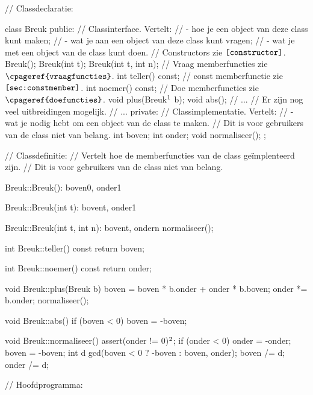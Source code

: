 \begin{cpplstShortInline}
\begin{cpplstfragment}[mathescape=true]
// Classdeclaratie:

$\label{breuk1::classdeclaratie}$class Breuk {
public:
    // Classinterface. Vertelt:
    // - hoe je een object van deze class kunt maken;
    // - wat je aan een object van deze class kunt vragen;
    // - wat je met een object van de class kunt doen.
    // Constructors zie $\texttt{\cref{constructor}}$.
    Breuk(); 
    Breuk(int t);
    Breuk(int t, int n);
    // Vraag memberfuncties zie $\texttt{\cpageref{vraagfuncties}}$.
    int teller() const; // const memberfunctie zie $\texttt{\cref{sec:constmember}}$.
    int noemer() const;
    // Doe memberfuncties zie $\texttt{\cpageref{doefuncties}}$.
    void plus(Breuk$%
        \label{better used const reference 2}%
        \footnotemark%
        \makeatletter%
        \global\let\saved@Href@C\Hy@footnote@currentHref%
        \makeatother%
        $ b);
    void abs();
    // ...
    // Er zijn nog veel uitbreidingen mogelijk.
    // ...
private:
    // Classimplementatie. Vertelt:
    // - wat je nodig hebt om een object van de class te maken.
    // Dit is voor gebruikers van de class niet van belang.
    int boven;
    int onder;
    void normaliseer();
};

// Classdefinitie:
// Vertelt hoe de memberfuncties van de class geïmplenteerd zijn.
// Dit is voor gebruikers van de class niet van belang.

Breuk::Breuk(): boven{0}, onder{1} {
}

Breuk::Breuk(int t): boven{t}, onder{1} {
}

Breuk::Breuk(int t, int n): boven{t}, onder{n} {
    normaliseer();
}

int Breuk::teller() const {
    return boven;
}

int Breuk::noemer() const {
    return onder;
}

void Breuk::plus(Breuk b) {
    boven = boven * b.onder + onder * b.boven;
    onder *= b.onder;
    normaliseer();
}

void Breuk::abs() {
    if (boven < 0) boven = -boven;
}

void Breuk::normaliseer() {
    assert(onder != 0)$%
        \footnotemark%
        \makeatletter%
        \global\let\saved@Href@D\Hy@footnote@currentHref%
        \makeatother%
        $;
    if (onder < 0) {
        onder = -onder;
        boven = -boven;
    }
    int d {gcd(boven < 0 ? -boven : boven, onder)};
    boven /= d;
    onder /= d;
}

// Hoofdprogramma:


\end{cpplstfragment}
\end{cpplstShortInline}
